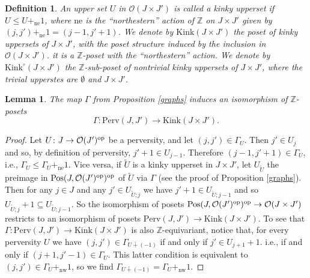 \documentclass{article}
\newtheorem{lem}[thm]{Lemma}
\newtheorem{defn}[thm]{Definition}
\theoremstyle{definition}
\newcommand{\Z}{\mathbb{Z}}
\newcommand{\Oo}{\mathcal{O}}
\newcommand{\pos}{\textnormal{Pos}}
\newcommand{\op}{\textnormal{op}}
\newcommand{\gr}{\Gamma}
\begin{document}
\begin{defn}
An upper set $U$ in $\Oo(J\times J')$ is called a \emph{kinky upperset} if $U\leq U+_\mathrm{ne}1$, where ${\mathrm{ne}}$ is the ``northestern'' action of $\Z$ on $J\times J'$ given by
$(j,j')+_{\mathrm{ne}}1=(j-1,j'+1)$. We denote by $\mathrm{Kink}(J\times J')$ the poset of kinky uppersets of $J\times J'$, with the poset structure induced by the inclusion in $\Oo(J\times J')$. it is a $\Z$-poset with the ``northestern'' action. We denote by $\mathrm{Kink}^\circ(J\times J')$ the $\Z$-sub-poset of nontrivial kinky uppersets of $J\times J'$, where 
the trivial upperstes are $\emptyset$ and $J\times J'$.
\end{defn}

\begin{lem}
 The map $\Gamma$ from Proposition \ref{graphs} induces an isomorphism of $\Z$-posets
  \[
 \gr \colon \mathrm{Perv}(J,J')\to \mathrm{Kink}(J\times J').
  \]
\end{lem}
\begin{proof}
Let $U\colon J\to \Oo(J')^\op$ be a perversity, and let $(j,j')\in \Gamma_U$. Then $j'\in U_{j}$ and so, by definition of perversity, $j'+1\in U_{j-1}$. Therefore $(j-1,j'+1)\in \Gamma_U$, i.e., $\Gamma_U\leq \Gamma_U+_{\mathrm{ne}} 1$. Vice versa, if $\tilde{U}$ is a kinky upperset in $J\times J'$, let $U_{\tilde{U}}$ the preimage in $\pos(J,\Oo(J')^\op)^\op$ of $\tilde{U}$ via $\Gamma$ (see the proof of Proposition \ref{graphs}). Then for any $j\in J$ and any $j'\in U_{\tilde{U};j}$ we have $j'+1\in U_{\tilde{U};j-1}$ and so $U_{\tilde{U};j}+1\subseteq U_{\tilde{U};j-1}$. So the isomorphism of posets $\pos(J,\Oo(J')^\op)^\op\to \Oo(J \times J')$ restricts to an isomorphism of posets $\mathrm{Perv}(J,J')\to \mathrm{Kink}(J\times J')$. To see that $ \gr \colon \mathrm{Perv}(J,J')\to \mathrm{Kink}(J\times J')$ is also $\Z$-equivariant, notice that, for every perversity $U$ we have $(j,j')\in \Gamma_{U\dotplus (-1)}$ if and only if $j'\in U_{j+1}+1$. i.e., if and only if $(j+1,j'-1)\in \Gamma_U$. This latter condition is equivalent to $(j,j')\in \Gamma_U+_{\mathrm{nw}}1$, so we find $\Gamma_{U\dotplus (-1)}=\Gamma_U+_{\mathrm{nw}}1$.
\end{proof}
\end{document}
